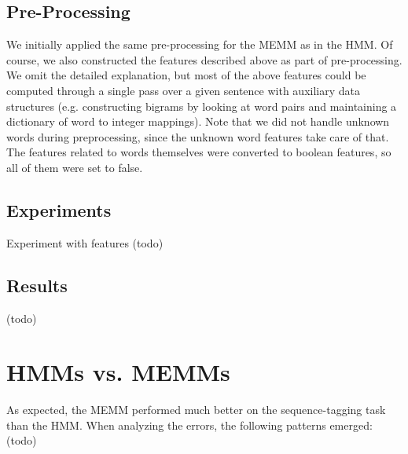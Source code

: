 \documentclass[12pt]{article}
\begin{document}
\subsection{Pre-Processing}
We initially applied the same pre-processing for the MEMM as in the HMM. Of course, we also constructed the features described above as part of pre-processing. We omit the detailed explanation, but most of the above features could be computed through a single pass over a given sentence with auxiliary data structures (e.g. constructing bigrams by looking at word pairs and maintaining a dictionary of word to integer mappings). Note that we did not handle unknown words during preprocessing, since the unknown word features take care of that. The features related to words themselves were converted to boolean features, so all of them were set to false.    
\subsection{Experiments}
Experiment with features (todo)
\subsection{Results}
(todo)
\section{HMMs vs. MEMMs}
As expected, the MEMM performed much better on the sequence-tagging task than the HMM. When analyzing the errors, the following patterns emerged: (todo)
\end{document}
